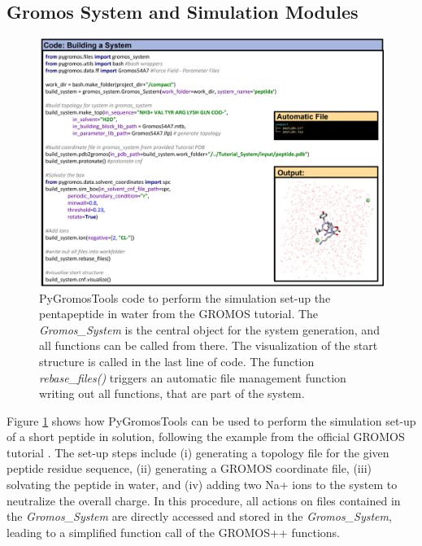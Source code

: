 \subsection{Gromos System and Simulation Modules}
\begin{figure}[h!]
    \centering
    \includegraphics[width=\textwidth]{fig/ApplicationExamples/codeExample_GROMOSSystemSolvBoxTut.png}
    \caption{PyGromosTools code to perform the simulation set-up the pentapeptide in water from the GROMOS tutorial\cite{Lier2020}. The \textit{Gromos\_System} is the central object for the system generation, and all functions can be called from there. The visualization of the start structure is called in the last line of code. The function \textit{rebase\_files()} triggers an automatic file management function writing out all functions, that are part of the system.}
    \label{fig: GROMOSSystemExample}
\end{figure}

Figure \ref{fig: GROMOSSystemExample} shows how PyGromosTools can be used to perform the simulation set-up of a short peptide in solution, following the example from the official GROMOS tutorial \cite{Lier2020}. The set-up steps include (i) generating a topology file for the given peptide residue sequence, (ii) generating a GROMOS coordinate file, (iii) solvating the peptide in water, and (iv) adding two Na+ ions to the system to neutralize the overall charge. In this procedure, all actions on files contained in the \textit{Gromos\_System} are directly accessed and stored in the \textit{Gromos\_System}, leading to a simplified function call of the GROMOS++ functions. 



